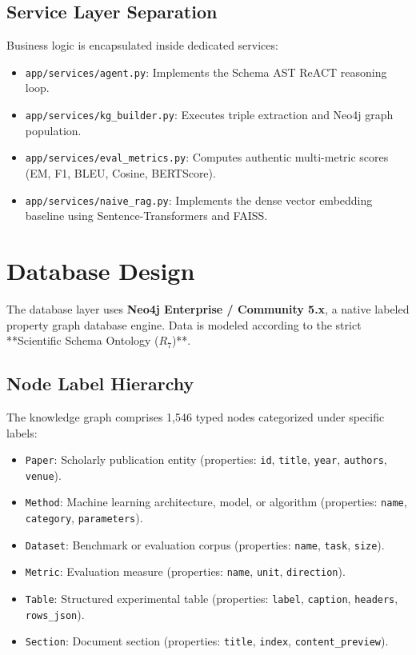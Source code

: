 \documentclass[12pt,a4paper,oneside]{report}
\begin{document}
\subsection{Service Layer Separation}
Business logic is encapsulated inside dedicated services:
\begin{itemize}
    \item \texttt{app/services/agent.py}: Implements the Schema AST ReACT reasoning loop.
    \item \texttt{app/services/kg\_builder.py}: Executes triple extraction and Neo4j graph population.
    \item \texttt{app/services/eval\_metrics.py}: Computes authentic multi-metric scores (EM, F1, BLEU, Cosine, BERTScore).
    \item \texttt{app/services/naive\_rag.py}: Implements the dense vector embedding baseline using Sentence-Transformers and FAISS.
\end{itemize}

\section{Database Design}
The database layer uses \textbf{Neo4j Enterprise / Community 5.x}, a native labeled property graph database engine. Data is modeled according to the strict **Scientific Schema Ontology ($R_7$)**.

\subsection{Node Label Hierarchy}
The knowledge graph comprises 1,546 typed nodes categorized under specific labels:
\begin{itemize}
    \item \texttt{Paper}: Scholarly publication entity (properties: \texttt{id}, \texttt{title}, \texttt{year}, \texttt{authors}, \texttt{venue}).
    \item \texttt{Method}: Machine learning architecture, model, or algorithm (properties: \texttt{name}, \texttt{category}, \texttt{parameters}).
    \item \texttt{Dataset}: Benchmark or evaluation corpus (properties: \texttt{name}, \texttt{task}, \texttt{size}).
    \item \texttt{Metric}: Evaluation measure (properties: \texttt{name}, \texttt{unit}, \texttt{direction}).
    \item \texttt{Table}: Structured experimental table (properties: \texttt{label}, \texttt{caption}, \texttt{headers}, \texttt{rows\_json}).
    \item \texttt{Section}: Document section (properties: \texttt{title}, \texttt{index}, \texttt{content\_preview}).
\end{itemize}
\end{document}

